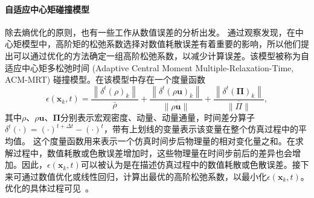\paragraph{自适应中心矩碰撞模型}
除去熵优化的原则，也有一些工作从数值误差的分析出发。\citet{Li-2020} 通过观察发现，在中心矩模型中，高阶矩的松弛系数选择对数值耗散误差有着重要的影响，所以他们提出可以通过优化的方法确定一组高阶松弛系数，以减少计算误差。该模型被称为自适应中心矩多松弛时间 (Adaptive Central Moment Multiple-Relaxation-Time, ACM-MRT) 碰撞模型。在该模型中存在一个度量函数
\begin{equation}
    \epsilon\left(\mathbf{x}_k, t\right)=\frac{\left\|\delta^t(\rho)_k\right\|}{\bar{\rho}}+\frac{\left\|\delta^t(\rho \mathbf{u})_k\right\|}{\overline{\|\rho \mathbf{u}\|}}+\frac{\left\|\delta^t(\boldsymbol{\Pi})_k\right\|}{\overline{\|\Pi\|}},
\end{equation}
其中$\rho$、$\rho \mathbf{u}$、$\boldsymbol{\Pi}$分别表示宏观密度、动量、动量通量，时间差分算子$\delta^t(\cdot)=(\cdot)^{t+\Delta t}-(\cdot)^{t}$，带有上划线的变量表示该变量在整个仿真过程中的平均值。
这个度量函数用来表示一个仿真时间步后物理量的相对变化量之和。在求解过程中，数值耗散或色散误差增加时，这些物理量在时间步前后的差异也会增加。因此，$\epsilon(\mathbf{x}_k, t)$可以被认为是在描述仿真过程中的数值耗散或色散误差。接下来可通过数值优化或线性回归，计算出最优的高阶松弛系数，以最小化$\epsilon\left(\mathbf{x}_k, t\right)$。优化的具体过程可见~\citep{Li-2020}。

